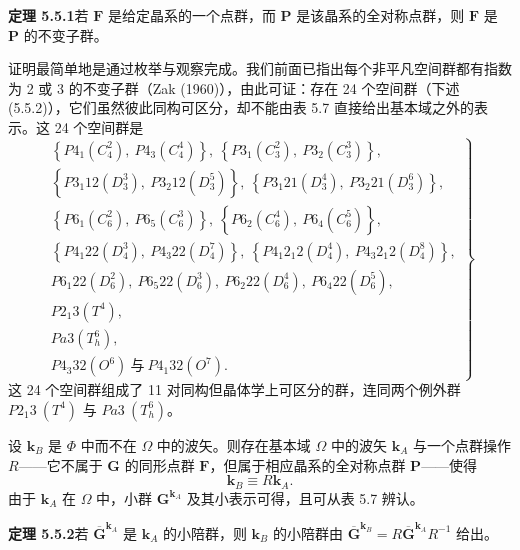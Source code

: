\noindent\textbf{定理 5.5.1}\quad 若 $\mathbf{F}$ 是给定晶系的一个点群，而 $\mathbf{P}$ 是该晶系的全对称点群，则 $\mathbf{F}$ 是 $\mathbf{P}$ 的不变子群。

证明最简单地是通过枚举与观察完成。我们前面已指出每个非平凡空间群都有指数为 2 或 3 的不变子群（Zak (1960)），由此可证：存在 24 个空间群（下述 (5.5.2)），它们虽然彼此同构可区分，却不能由表 5.7 直接给出基本域之外的表示。这 24 个空间群是
\begin{equation*}
\left.
\begin{array}{l}
\left\{P4_{1}(C^{2}_{4}),\ P4_{3}(C^{4}_{4})\right\},\ \left\{P3_{1}(C^{2}_{3}),\ P3_{2}(C^{3}_{3})\right\},\\
\left\{P3_{1}12(D^{3}_{3}),\ P3_{2}12(D^{5}_{3})\right\},\ \left\{P3_{1}21(D^{4}_{3}),\ P3_{2}21(D^{6}_{3})\right\},\\
\left\{P6_{1}(C^{2}_{6}),\ P6_{5}(C^{3}_{6})\right\},\ \left\{P6_{2}(C^{4}_{6}),\ P6_{4}(C^{5}_{6})\right\},\\
\left\{P4_{1}22(D^{3}_{4}),\ P4_{3}22(D^{7}_{4})\right\},\ \left\{P4_{1}2_{1}2(D^{4}_{4}),\ P4_{3}2_{1}2(D^{8}_{4})\right\},\\
P6_{1}22(D^{2}_{6}),\ P6_{5}22(D^{3}_{6}),\ P6_{2}22(D^{4}_{6}),\ P6_{4}22(D^{5}_{6}),\\
P2_{1}3(T^{4}),\\
Pa3(T^{6}_{h}),\\
P4_{3}32(O^{6})\ \text{与}\ P4_{1}32(O^{7}).
\end{array}
\right\}
\tag{5.5.2}
\end{equation*}
这 24 个空间群组成了 11 对同构但晶体学上可区分的群，连同两个例外群 $P2_{1}3\ (T^{4})$ 与 $Pa3\ (T^{6}_{h})$。

设 $\mathbf{k}_{B}$ 是 $\Phi$ 中而不在 $\Omega$ 中的波矢。则存在基本域 $\Omega$ 中的波矢 $\mathbf{k}_{A}$ 与一个点群操作 $R$——它不属于 $\mathbf{G}$ 的同形点群 $\mathbf{F}$，但属于相应晶系的全对称点群 $\mathbf{P}$——使得
\begin{equation*}
\mathbf{k}_{B} \equiv R\mathbf{k}_{A}.
\tag{5.5.1}
\end{equation*}
由于 $\mathbf{k}_{A}$ 在 $\Omega$ 中，小群 $\mathbf{G}^{\mathbf{k}_{A}}$ 及其小表示可得，且可从表 5.7 辨认。

\noindent\textbf{定理 5.5.2}\quad 若 $\overline{\mathbf{G}}^{\mathbf{k}_{A}}$ 是 $\mathbf{k}_{A}$ 的小陪群，则 $\mathbf{k}_{B}$ 的小陪群由 $\overline{\mathbf{G}}^{\mathbf{k}_{B}} = R\overline{\mathbf{G}}^{\mathbf{k}_{A}}R^{-1}$ 给出。

